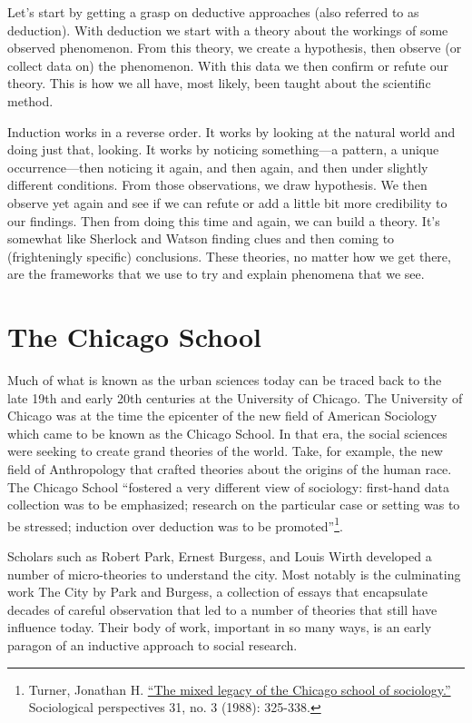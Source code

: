 \documentclass[
]{book}
\begin{document}
Let's start by getting a grasp on deductive approaches (also referred to as deduction). With deduction we start with a theory about the workings of some observed phenomenon. From this theory, we create a hypothesis, then observe (or collect data on) the phenomenon. With this data we then confirm or refute our theory. This is how we all have, most likely, been taught about the scientific method.

Induction works in a reverse order. It works by looking at the natural world and doing just that, looking. It works by noticing something---a pattern, a unique occurrence---then noticing it again, and then again, and then under slightly different conditions. From those observations, we draw hypothesis. We then observe yet again and see if we can refute or add a little bit more credibility to our findings. Then from doing this time and again, we can build a theory. It's somewhat like Sherlock and Watson finding clues and then coming to (frighteningly specific) conclusions. These theories, no matter how we get there, are the frameworks that we use to try and explain phenomena that we see.

\hypertarget{the-chicago-school}{%
\section{The Chicago School}\label{the-chicago-school}}

Much of what is known as the urban sciences today can be traced back to the late 19th and early 20th centuries at the University of Chicago. The University of Chicago was at the time the epicenter of the new field of American Sociology which came to be known as the Chicago School. In that era, the social sciences were seeking to create grand theories of the world. Take, for example, the new field of Anthropology that crafted theories about the origins of the human race. The Chicago School ``fostered a very different view of sociology: first-hand data collection was to be emphasized; research on the particular case or setting was to be stressed; induction over deduction was to be promoted''\footnote{Turner, Jonathan H. \href{https://journals.sagepub.com/doi/10.2307/1389202}{``The mixed legacy of the Chicago school of sociology.''} Sociological perspectives 31, no. 3 (1988): 325-338.}.

Scholars such as Robert Park, Ernest Burgess, and Louis Wirth developed a number of micro-theories to understand the city. Most notably is the culminating work The City by Park and Burgess, a collection of essays that encapsulate decades of careful observation that led to a number of theories that still have influence today. Their body of work, important in so many ways, is an early paragon of an inductive approach to social research.
\end{document}
